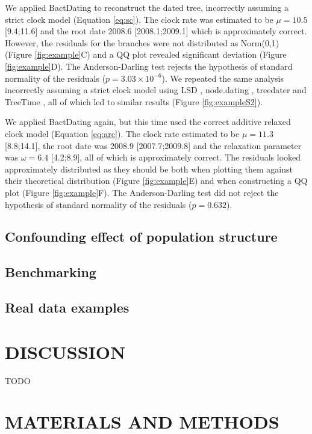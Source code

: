 \documentclass{article}
\begin{document}
We applied BactDating \citep{Didelot2018} to reconstruct the dated tree, 
incorrectly assuming a strict clock model (Equation \ref{eq:sc}).
The clock rate was estimated to be $\mu=10.5$ [9.4;11.6] and the root date 
2008.6 [2008.1;2009.1] which is approximately correct.
However, the residuals for the branches were not distributed as Norm(0,1) (Figure \ref{fig:example}C)
and a QQ plot revealed significant deviation (Figure \ref{fig:example}D). 
The Anderson-Darling test rejects the hypothesis of standard normality of the residuals ($p=3.03\times10^{-6}$).
We repeated the same analysis incorrectly assuming a strict clock model using 
LSD \citep{To2016}, node.dating \citep{Jones2017}, treedater \citep{Volz2017} and TreeTime \citep{Sagulenko2018},
all of which led to similar results (Figure \ref{fig:exampleS2}). 

We applied BactDating again, but this time used the correct additive relaxed clock model (Equation \ref{eq:arc}). 
The clock rate estimated to be $\mu=11.3$ [8.8;14.1], the root date was 2008.9 [2007.7;2009.8]
and the relaxation parameter was $\omega=6.4$ [4.2;8.9], all of which is approximately correct.
The residuals looked approximately distributed as they should be both when plotting them against
their theoretical distribution (Figure \ref{fig:example}E) and when constructing a QQ plot (Figure \ref{fig:example}F).
The Anderson-Darling test did not reject the hypothesis of standard normality of the residuals ($p=0.632$).

\subsection*{Confounding effect of population structure}

\subsection*{Benchmarking}

\subsection*{Real data examples}

\section*{DISCUSSION}

TODO

\section*{MATERIALS AND METHODS}
\end{document}
